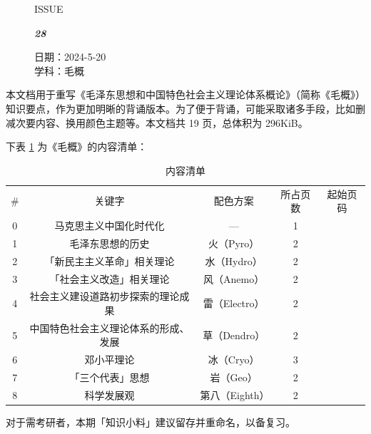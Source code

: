 \documentclass[UTF8]{ctexart}
\newcommand\Black[1]{\textcolor[gray]{0.3}{#1}}
\newcommand\Brown[1]{\textcolor[HTML]{998A4E}{#1}}
\newcommand\IssueNumber{28}
\newcommand\Date{2024-5-20}
\newcommand\Subject{毛概}
\begin{document}
\begin{figure}[H]
\hspace{1cm}
\begin{minipage}[t]{0.3\textwidth}
\centering
    \Brown{\Genshin ISSUE}

    \vspace{-0.6cm}
    \Huge \Issue\slshape\bfseries\Black{\IssueNumber}
\end{minipage}
\hfill
\begin{minipage}[t]{0.35\textwidth}
\small
\centering
    \Brown{日期：\Date} \\
\vspace{-0.1cm}
    \Brown{学科：\Subject} \\
\end{minipage}
\hspace{0.8cm}
\end{figure}

{\color{cyan!50!black} 本文档用于重写《毛泽东思想和中国特色社会主义理论体系概论》（简称《毛概》）知识要点，作为更加明晰的背诵版本。为了便于背诵，可能采取诸多手段，比如删减次要内容、换用颜色主题等。本文档共 19 页，总体积为 296KiB。

下表 \ref{tab:清单} 为《毛概》的内容清单：

\begin{table}[htb]
  \centering\small
  \begin{tabular}{ccccc}
  \rowcolor{brown}\color{white}
   \# & \color{white} 关键字 & \color{white} 配色方案 & \color{white} 所占页数 & \color{white} 起始页码 \\
  \rowcolor{brown!30}
  0 & 马克思主义中国化时代化 & — & 1 & \pageref{sec:0} \\
  \rowcolor{c1-med}
  1 & 毛泽东思想的历史 & 火（Pyro） & 2 & \pageref{sec:1} \\
  \rowcolor{c2-med}
  2 & 「新民主主义革命」相关理论 &  水（Hydro） & 2 & \pageref{sec:2} \\
  \rowcolor{c3-med}
  3 & 「社会主义改造」相关理论 &  风（Anemo） & 2 & \pageref{sec:3} \\
  \rowcolor{c4-med}
  4 & 社会主义建设道路初步探索的理论成果 &  雷（Electro） & 2 & \pageref{sec:4} \\
  \rowcolor{c5-med}
  5 & 中国特色社会主义理论体系的形成、发展 &  草（Dendro） & 2 & \pageref{sec:5} \\
  \rowcolor{c6-med}
  6 & 邓小平理论 &  冰（Cryo） & 3 & \pageref{sec:6} \\
  \rowcolor{c7-med}
  7 & 「三个代表」思想 &  岩（Geo） & 2 & \pageref{sec:7} \\
  \rowcolor{c8-med}
  8 & 科学发展观 &  第八（Eighth） & 2 & \pageref{sec:8} \\
  \end{tabular}
  \caption{内容清单}\label{tab:清单}
\end{table}

对于需考研者，本期「知识小料」建议留存并重命名，以备复习。
}
\end{document}
